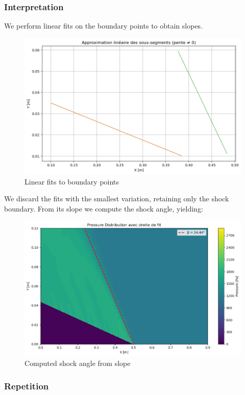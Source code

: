 \subsubsection{Interpretation}

We perform linear fits on the boundary points to obtain slopes.
\begin{figure}[H]
    \centering
    \includegraphics[width=0.5\linewidth]{ressources/figures/slope.png}
    \caption{Linear fits to boundary points}
    \label{fig:slopes}
\end{figure}
We discard the fits with the smallest variation, retaining only the shock boundary. From its slope we compute the shock angle, yielding:
\begin{figure}[H]
    \centering
    \includegraphics[width=0.5\linewidth]{ressources/figures/final_slope.png}
    \caption{Computed shock angle from slope}
    \label{fig:interpretation}
\end{figure}

\subsubsection{Repetition}

